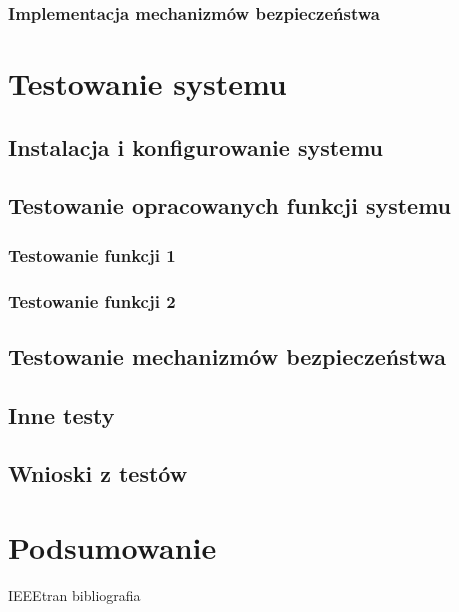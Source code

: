 \documentclass[a4paper, 12pt]{article}
\begin{document}
\subsubsection{Implementacja mechanizmów bezpieczeństwa}

\section{Testowanie systemu}
\subsection{Instalacja i konfigurowanie systemu}
\subsection{Testowanie opracowanych funkcji systemu}
\subsubsection{Testowanie funkcji 1}
\subsubsection{Testowanie funkcji 2}
\subsection{Testowanie mechanizmów bezpieczeństwa}
\subsection{Inne testy}
\subsection{Wnioski z testów}
\section{Podsumowanie}

 {IEEEtran}
 {bibliografia} 
\nocite {*}
\end{document}
